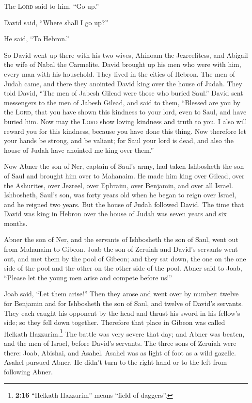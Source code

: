 The \textsc{Lord} said to him, ``Go up.''

David said, ``Where shall I go up?''

He said, ``To Hebron.''

 So David went up there with his two wives, Ahinoam the
Jezreelitess, and Abigail the wife of Nabal the Carmelite.
 David brought up his men who were with him, every man
with his household. They lived in the cities of Hebron. 
The men of Judah came, and there they anointed David king over the house
of Judah. They told David, ``The men of Jabesh Gilead were those who
buried Saul.''  David sent messengers to the men of Jabesh
Gilead, and said to them, ``Blessed are you by the \textsc{Lord}, that
you have shown this kindness to your lord, even to Saul, and have buried
him.  Now may the \textsc{Lord} show loving kindness and
truth to you. I also will reward you for this kindness, because you have
done this thing.  Now therefore let your hands be strong,
and be valiant; for Saul your lord is dead, and also the house of Judah
have anointed me king over them.''

 Now Abner the son of Ner, captain of Saul's army, had
taken Ishbosheth the son of Saul and brought him over to Mahanaim.
 He made him king over Gilead, over the Ashurites, over
Jezreel, over Ephraim, over Benjamin, and over all Israel.
 Ishbosheth, Saul's son, was forty years old when he
began to reign over Israel, and he reigned two years. But the house of
Judah followed David.  The time that David was king in
Hebron over the house of Judah was seven years and six months.

 Abner the son of Ner, and the servants of Ishbosheth the
son of Saul, went out from Mahanaim to Gibeon.  Joab the
son of Zeruiah and David's servants went out, and met them by the pool
of Gibeon; and they sat down, the one on the one side of the pool and
the other on the other side of the pool.  Abner said to
Joab, ``Please let the young men arise and compete before us!''

Joab said, ``Let them arise!''  Then they arose and went
over by number: twelve for Benjamin and for Ishbosheth the son of Saul,
and twelve of David's servants.  They each caught his
opponent by the head and thrust his sword in his fellow's side; so they
fell down together. Therefore that place in Gibeon was called Helkath
Hazzurim.\footnote{\textbf{2:16} ``Helkath Hazzurim'' means ``field of
  daggers''.}  The battle was very severe that day; and
Abner was beaten, and the men of Israel, before David's servants.
 The three sons of Zeruiah were there: Joab, Abishai, and
Asahel. Asahel was as light of foot as a wild gazelle. 
Asahel pursued Abner. He didn't turn to the right hand or to the left
from following Abner.

